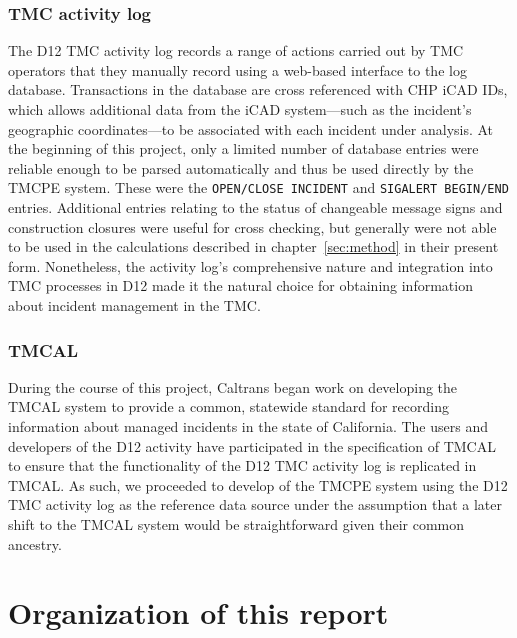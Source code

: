 \documentclass[12pt]{report}
\begin{document}
\subsubsection{TMC activity log}
\label{sec:tmc-activity-log}

The \ac{D12} \ac{TMC} activity log records a range of actions carried
out by \ac{TMC} operators that they manually record using a web-based
interface to the log database.  Transactions in the database are cross
referenced with \ac{CHP} \ac{iCAD} IDs, which allows additional data
from the \ac{iCAD} system---such as the incident's geographic
coordinates---to be associated with each incident under analysis.  At
the beginning of this project, only a limited number of database
entries were reliable enough to be parsed automatically and thus be
used directly by the \ac{TMCPE} system.  These were the
\texttt{OPEN/CLOSE INCIDENT} and \texttt{SIGALERT BEGIN/END} entries.
Additional entries relating to the status of changeable message signs
and construction closures were useful for cross checking, but
generally were not able to be used in the calculations described in
chapter~\ref{sec:method} in their present form.  Nonetheless, the
activity log's comprehensive nature and integration into \ac{TMC}
processes in \ac{D12} made it the natural choice for obtaining
information about incident management in the \ac{TMC}.


\subsubsection{TMCAL}
\label{sec:tmcal}

During the course of this project, Caltrans began work on developing
the \ac{TMCAL} system to provide a common, statewide standard for
recording information about managed incidents in the state of
California.  The users and developers of the \ac{D12} activity have
participated in the specification of \ac{TMCAL} to ensure that the
functionality of the \ac{D12} \ac{TMC} activity log is replicated in
TMCAL.  As such, we proceeded to develop of the \ac{TMCPE} system
using the \ac{D12} \ac{TMC} activity log as the reference data source
under the assumption that a later shift to the \ac{TMCAL} system would
be straightforward given their common ancestry.

\section{Organization of this report}
\label{sec:organization}
\end{document}
